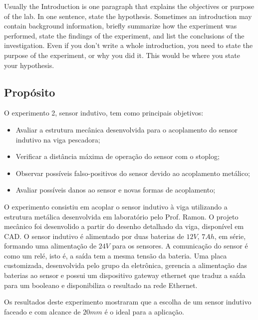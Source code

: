 
 
Usually the Introduction is one paragraph that explains the objectives or purpose of the lab. In one sentence, state the hypothesis. Sometimes an introduction may contain background information, briefly summarize how the experiment was performed, state the findings of the experiment, and list the conclusions of the investigation. Even if you don't write a whole introduction, you need to state the purpose of the experiment, or why you did it. This would be where you state your hypothesis.

\subsection{Propósito}
O experimento 2, sensor indutivo, tem como principais objetivos:
 \begin{itemize}
 \item Avaliar a estrutura mecânica desenvolvida para o acoplamento do sensor
 indutivo na viga pescadora;
 \item Verificar a distância máxima de operação do sensor com o stoplog;
 \item Observar possíveis falso-positivos do sensor devido ao acoplamento
 metálico;
 \item Avaliar possíveis danos ao sensor e novas formas de acoplamento;
 \end{itemize}
\label{proposito}
O experimento consistiu em acoplar o sensor indutivo à viga utilizando a
estrutura metálica desenvolvida em laboratório pelo Prof. Ramon. O projeto
mecânico foi desenvolido a partir do desenho detalhado da viga,
disponível em CAD.
O sensor indutivo é alimentado por duas baterias de $12V$, $7Ah$, em série, formando uma alimentação de $24V$ para
os sensores. A comunicação do sensor é como um relé, isto é, a saída tem a mesma
tensão da bateria. Uma placa customizada, desenvolvida pelo grupo da eletrônica,
gerencia a alimentação das baterias ao sensor e possui um
dispositivo gateway ethernet que traduz a saída para um booleano e
disponibiliza o resultado na rede Ethernet.

Os resultados deste experimento mostraram que a escolha de um sensor indutivo
faceado e com alcance de $20mm$ é o ideal para a aplicação.
